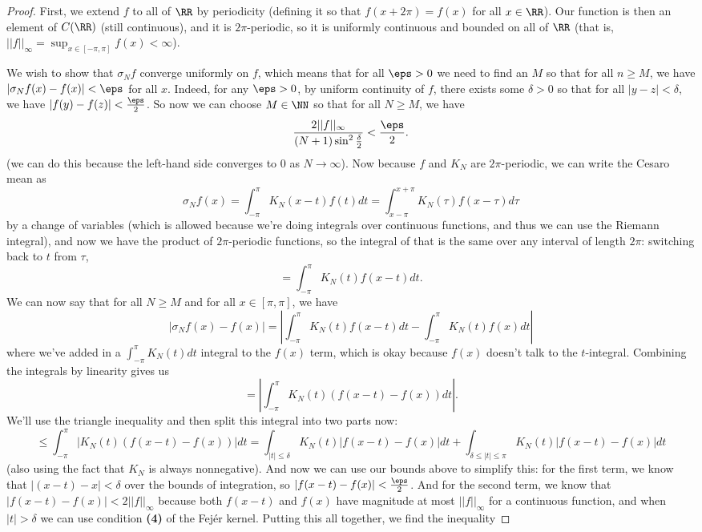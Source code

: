 \begin{proof}
First, we extend $f$ to all of $\RR$ by periodicity (defining it so that $f(x + 2\pi) = f(x)$ for all $x \in \RR$). Our function is then an element of $C(\RR)$ (still continuous), and it is $2\pi$-periodic, so it is uniformly continuous and bounded on all of $\RR$ (that is, $||f||_{\infty} = \sup_{x \in [-\pi, \pi]} f(x) < \infty$). 

We wish to show that $\sigma_N f$ converge uniformly on $f$, which means that for all $\eps > 0$ we need to find an $M$ so that for all $n \ge M$, we have $|\sigma_N f(x) - f(x)| < \eps$ for all $x$. Indeed, for any $\eps > 0$, by uniform continuity of $f$, there exists some $\delta > 0$ so that for all $|y-z| < \delta$, we have $|f(y) - f(z)| < \frac{\eps}{2}$. So now we can choose $M \in \NN$ so that for all $N \ge M$, we have
\[
    \frac{2||f||_{\infty}}{(N+1) \sin^2\frac{\delta}{2}} < \frac{\eps}{2}.
\]
(we can do this because the left-hand side converges to $0$ as $N \to \infty$). Now because $f$ and $K_N$ are $2\pi$-periodic, we can write the Cesaro mean as 
\[
    \sigma_N f(x) = \int_{-\pi}^{\pi} K_N(x-t) f(t) dt = \int_{x-\pi}^{x+\pi} K_N(\tau) f(x-\tau) d\tau
\]
by a change of variables (which is allowed because we're doing integrals over continuous functions, and thus we can use the Riemann integral), and now we have the product of $2\pi$-periodic functions, so the integral of that is the same over any interval of length $2\pi$: switching back to $t$ from $\tau$,
\[
    = \int_{-\pi}^{\pi} K_N(t) f(x-t) dt.
\]
We can now say that for all $N \ge M$ and for all $x \in [\pi, \pi]$, we have
\[
    |\sigma_N f(x) - f(x)| = \left|\int_{-\pi}^{\pi} K_N(t) f(x-t) dt - \int_{-\pi}^{\pi} K_N(t) f(x) dt\right|
\]
where we've added in a $\int_{-\pi}^{\pi} K_N(t) dt$ integral to the $f(x)$ term, which is okay because $f(x)$ doesn't talk to the $t$-integral. Combining the integrals by linearity gives us 
\[
    = \left|\int_{-\pi}^{\pi} K_N(t) \left(f(x-t) - f(x)\right) dt\right|.
\]
We'll use the triangle inequality and then split this integral into two parts now:
\[
    \le \int_{-\pi}^{\pi} \left| K_N(t) \left(f(x-t) - f(x)\right) \right| dt = \int_{|t| \le \delta} K_N(t) \left|f(x-t) - f(x)\right| dt + \int_{\delta \le |t| \le \pi} K_N(t) \left|f(x-t) - f(x)\right| dt
\]
(also using the fact that $K_N$ is always nonnegative). And now we can use our bounds above to simplify this: for the first term, we know that $|(x-t) - x| < \delta$ over the bounds of integration, so $|f(x-t) - f(x)| < \frac{\eps}{2}$. And for the second term, we know that $|f(x-t) - f(x)| < 2||f||_{\infty}$ because both $f(x-t)$ and $f(x)$ have magnitude at most $||f||_{\infty}$ for a continuous function, and when $|t| > \delta$ we can use condition \textbf{(4)} of the Fej\'er kernel. Putting this all together, we find the inequality

\end{proof}
